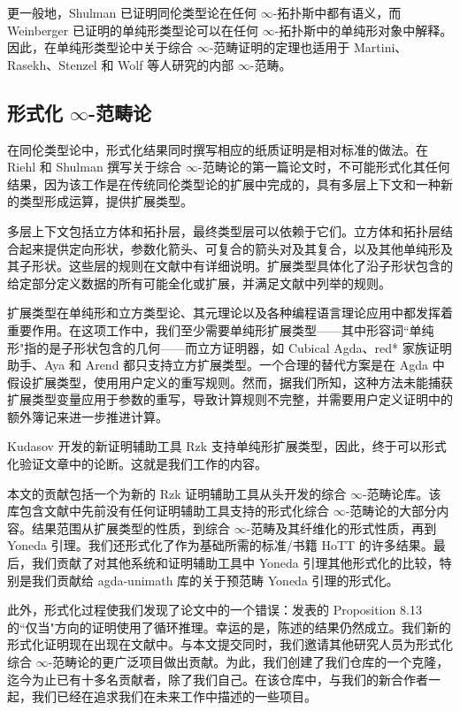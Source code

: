 \documentclass[12pt,a4paper]{article}
\theoremstyle{definition}
\theoremstyle{definition}
\begin{document}
更一般地，Shulman 已证明同伦类型论在任何 $\infty$-拓扑斯中都有语义，而 Weinberger 已证明的单纯形类型论可以在任何 $\infty$-拓扑斯中的单纯形对象中解释。因此，在单纯形类型论中关于综合 $\infty$-范畴证明的定理也适用于 Martini、Rasekh、Stenzel 和 Wolf 等人研究的内部 $\infty$-范畴。

\subsection{形式化 $\infty$-范畴论}

在同伦类型论中，形式化结果同时撰写相应的纸质证明是相对标准的做法。在 Riehl 和 Shulman 撰写关于综合 $\infty$-范畴论的第一篇论文时，不可能形式化其任何结果，因为该工作是在传统同伦类型论的扩展中完成的，具有多层上下文和一种新的类型形成运算，提供扩展类型。

多层上下文包括立方体和拓扑层，最终类型层可以依赖于它们。立方体和拓扑层结合起来提供定向形状，参数化箭头、可复合的箭头对及其复合，以及其他单纯形及其子形状。这些层的规则在文献中有详细说明。扩展类型具体化了沿子形状包含的给定部分定义数据的所有可能全化或扩展，并满足文献中列举的规则。

扩展类型在单纯形和立方类型论、其元理论以及各种编程语言理论应用中都发挥着重要作用。在这项工作中，我们至少需要单纯形扩展类型——其中形容词``单纯形"指的是子形状包含的几何——而立方证明器，如 Cubical Agda、red* 家族证明助手、Aya 和 Arend 都只支持立方扩展类型。一个合理的替代方案是在 Agda 中假设扩展类型，使用用户定义的重写规则。然而，据我们所知，这种方法未能捕获扩展类型变量应用于参数的重写，导致计算规则不完整，并需要用户定义证明中的额外簿记来进一步推进计算。

Kudasov 开发的新证明辅助工具 Rzk 支持单纯形扩展类型，因此，终于可以形式化验证文章中的论断。这就是我们工作的内容。

本文的贡献包括一个为新的 Rzk 证明辅助工具从头开发的综合 $\infty$-范畴论库。该库包含文献中先前没有任何证明辅助工具支持的形式化综合 $\infty$-范畴论的大部分内容。结果范围从扩展类型的性质，到综合 $\infty$-范畴及其纤维化的形式性质，再到 Yoneda 引理。我们还形式化了作为基础所需的标准/书籍 HoTT 的许多结果。最后，我们贡献了对其他系统和证明辅助工具中 Yoneda 引理其他形式化的比较，特别是我们贡献给 agda-unimath 库的关于预范畴 Yoneda 引理的形式化。

此外，形式化过程使我们发现了论文中的一个错误：发表的 Proposition 8.13 的``仅当"方向的证明使用了循环推理。幸运的是，陈述的结果仍然成立。我们新的形式化证明现在出现在文献中。与本文提交同时，我们邀请其他研究人员为形式化综合 $\infty$-范畴论的更广泛项目做出贡献。为此，我们创建了我们仓库的一个克隆，迄今为止已有十多名贡献者，除了我们自己。在该仓库中，与我们的新合作者一起，我们已经在追求我们在未来工作中描述的一些项目。
\end{document}
